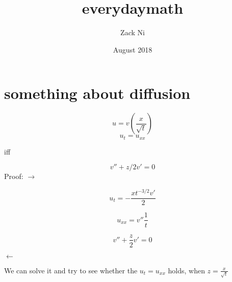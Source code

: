 \documentclass{article}
\title{everydaymath}
\author{Zack Ni }
\date{August 2018}
\begin{document}
\maketitle

\section{something about diffusion}

$$u = v(\frac{x}{\sqrt t})$$
$$u_t = u_{xx}$$

iff

$$v'' + z/2 v' =0$$
Proof:
$\rightarrow$

$$u_t =  -\frac{xt^{-3/2}v'}{2}$$

$$u_{xx} = v'' \frac{1}{t}$$

$$v''+\frac{z}{2} v' = 0$$

$\leftarrow$

We can solve it and try to see whether the $u_t = u_{xx}$ holds, when $z=\frac{x}{\sqrt t}$
\end{document}
